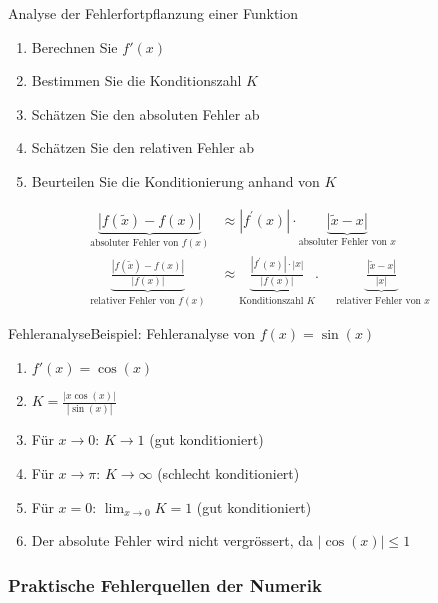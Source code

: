\begin{KR}{Analyse der Fehlerfortpflanzung einer Funktion}
\begin{enumerate}
    \item Berechnen Sie $f'(x)$
    \item Bestimmen Sie die Konditionszahl $K$
    \item Schätzen Sie den absoluten Fehler ab
    \item Schätzen Sie den relativen Fehler ab
    \item Beurteilen Sie die Konditionierung anhand von $K$
\end{enumerate}
\vspace{1mm}
$$
\begin{aligned}
\underbrace{|f(\tilde{x})-f(x)|}_{\text {absoluter Fehler von } f(x)} & \approx\left|f^{\prime}(x)\right| \cdot \underbrace{|\tilde{x}-x|}_{\text {absoluter Fehler von } x} \\
\underbrace{\frac{|f(\tilde{x})-f(x)|}{|f(x)|}}_{\text {relativer Fehler von } f(x)} & \approx \underbrace{\frac{\left|f^{\prime}(x)\right| \cdot|x|}{|f(x)|}}_{\text {Konditionszahl } K} . \quad \underbrace{\frac{|\tilde{x}-x|}{|x|}}_{\text { relativer Fehler von } x }
\end{aligned}
$$
\end{KR}

\raggedcolumns

\begin{example2}{Fehleranalyse}Beispiel: Fehleranalyse von $f(x)=\sin(x)$
\begin{enumerate}
    \item $f'(x) = \cos(x)$
    \item $K = \frac{|x\cos(x)|}{|\sin(x)|}$
    \item Für $x \to 0$: $K \to 1$ (gut konditioniert)
    \item Für $x \to \pi$: $K \to \infty$ (schlecht konditioniert)
    \item Für $x = 0$: $\lim_{x \to 0} K = 1$ (gut konditioniert)
    \item Der absolute Fehler wird nicht vergrössert, da $|\cos(x)| \leq 1$
\end{enumerate}
\end{example2}

\subsubsection{Praktische Fehlerquellen der Numerik}

